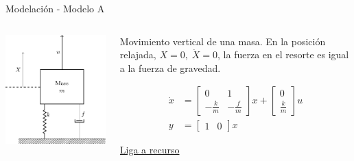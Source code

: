 \documentclass[presentation,aspectratio=1610]{beamer}
\begin{document}
\begin{frame}[label={sec:org587b783}]{Modelación - Modelo \alert{A}}
\begin{columns}
\begin{column}{0.5\columnwidth}
\includegraphics[height=0.5\textheight]{../../figures/mass-spring-damper}
\end{column}

\begin{column}{0.5\columnwidth}
Movimiento vertical de una masa. En la posición relajada, \(X=0, \; \dot{X} =0\), la fuerza en el resorte es igual a la fuerza de gravedad.  

\begin{align*}
\dot{x} &= \begin{bmatrix} 0 & 1\\-\frac{k}{m} & -\frac{f}{m}\end{bmatrix} x + \begin{bmatrix}0\\\frac{k}{m}\end{bmatrix}u\\ 
y &= \begin{bmatrix} 1 & 0\end{bmatrix} x 
\end{align*}

\href{https://lpsa.swarthmore.edu/Representations/SysRepSS.html\#SS\_MechT}{Liga a recurso}
\end{column}
\end{columns}
\end{frame}
\end{document}
